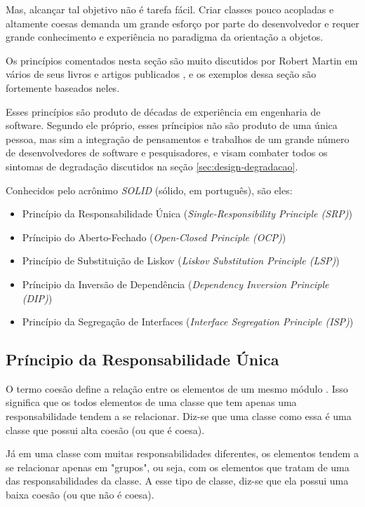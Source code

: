 Mas, alcançar tal objetivo não é tarefa fácil. Criar classes pouco acopladas e
altamente coesas demanda um grande esforço por parte do desenvolvedor e requer
grande conhecimento e experiência no paradigma da orientação a objetos.

Os princípios comentados nesta seção são muito discutidos por Robert Martin
em vários de seus livros e artigos publicados \cite{bob-martin}, e os exemplos
dessa seção são fortemente baseados neles. 

Esses princípios são produto de décadas de experiência em engenharia de
software. Segundo ele próprio, esses príncipios não são produto de uma única 
pessoa, mas sim a integração de pensamentos e trabalhos de um grande número de 
desenvolvedores de software  e pesquisadores, e visam combater todos os sintomas
de degradação discutidos na seção \ref{sec:design-degradacao}.

Conhecidos pelo acrônimo \textit{SOLID} (sólido, em português), são eles:

\begin{itemize}
	\item Princípio da Responsabilidade Única (\textit{Single-Responsibility 
	Principle (SRP)})
	\item Príncipio do Aberto-Fechado (\textit{Open-Closed Principle (OCP)})
	\item Princípio de Substituição de Liskov (\textit{Liskov Substitution 
	Principle (LSP)})
	\item Príncipio da Inversão de Dependência (\textit{Dependency Inversion
	Principle (DIP)})
	\item Princípio da Segregação de Interfaces (\textit{Interface Segregation 
	Principle (ISP)})
\end{itemize}

\subsection{Príncipio da Responsabilidade Única}
\label{subsec:principio-srp}

O termo coesão define a relação entre os elementos de um mesmo módulo
\cite{demarco} \cite{pagejones}. Isso significa que os todos elementos de uma 
classe que tem apenas uma responsabilidade tendem a se relacionar. Diz-se que
uma classe como essa é uma classe que possui alta coesão (ou que é coesa). 

Já em uma classe com muitas responsabilidades diferentes, os elementos tendem  a
se relacionar apenas em "grupos", ou seja, com os elementos que tratam de uma 
das responsabilidades da classe. A esse tipo de classe, diz-se que ela possui 
uma baixa coesão (ou que não é coesa).

